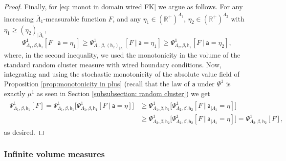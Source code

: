 \documentclass[11pt,a4paper]{article}
\numberwithin{equation}{section}
\theoremstyle{plain}
\theoremstyle{definition}
\begin{document}
\begin{proof}
Finally, for \eqref{eq: monot in domain wired FK} we argue as follows. For any increasing $\overline \Lambda_1$-measurable function $F$, and any $\eta_1\in (\mathbb R^+)^{\overline \Lambda_1}$, $\eta_2\in (\mathbb R^+)^{\overline \Lambda_2}$ with $\eta_1\geq (\eta_2)_{|\overline\Lambda_1}$,
\begin{equation}
    \Psi^1_{\Lambda_1,\beta,\mathsf{h}_1}[F\: | \: \mathsf{a}=\eta_1]\geq \Psi^1_{\Lambda_1,\beta,(\mathsf{h}_2)_{|\Lambda_1}}[F\: | \: \mathsf{a}=\eta_1]\geq \Psi^1_{\Lambda_2,\beta,\mathsf{h}_2}[F\: | \:\mathsf{a}=\eta_2],
\end{equation}
where, in the second inequality, we used the monotonicity in the volume of the standard random cluster measure with wired boundary conditions. Now, integrating and using the stochastic monotonicity of the absolute value field of Proposition \ref{prop:monotonicity in plus} (recall that the law of $\mathsf{a}$ under $\Psi^1$ is exactly $\mu^1$ as seen in Section \ref{subsubsection: random cluster}) we get
\begin{align}
\begin{aligned}
     \Psi^1_{\Lambda_1,\beta,\mathsf{h}_1}[F]=\Psi^1_{\Lambda_1,\beta,\mathsf{h}_1}\Big[\Psi^1_{\Lambda_1,\beta,\mathsf{h}_1}[F\: | \:\mathsf{a}=\eta]\Big]&\geq \Psi^1_{\Lambda_1,\beta,\mathsf{h}_1}\Big[\Psi^1_{\Lambda_2,\beta,\mathsf{h}_2}[F\: | \:\mathsf{a}_{|\Lambda_1}=\eta]\Big]\\&\geq \Psi^1_{\Lambda_2,\beta,\mathsf{h}_2}\Big[\Psi^1_{\Lambda_2,\beta,\mathsf{h}_2}[F\: | \:\mathsf{a}_{|\Lambda_1}=\eta]\Big]  = \Psi^1_{\Lambda_2,\beta,\mathsf{h}_2}[F],
\end{aligned}
\end{align}
as desired.
\end{proof}


\subsubsection{Infinite volume measures}
\end{document}
